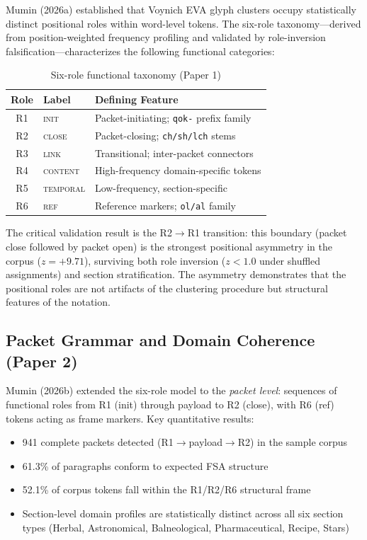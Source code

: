 \documentclass[11pt,a4paper,twocolumn]{article}
\begin{document}
Mumin (2026a) established that Voynich EVA glyph clusters occupy statistically distinct positional roles within word-level tokens. The six-role taxonomy---derived from position-weighted frequency profiling and validated by role-inversion falsification---characterizes the following functional categories:

\begin{table}[H]
\centering
\caption{Six-role functional taxonomy (Paper 1)}
\label{tab:roles}
\small
\begin{tabular}{@{}clp{3.5cm}@{}}
\toprule
\textbf{Role} & \textbf{Label} & \textbf{Defining Feature} \\
\midrule
R1 & \textsc{init} & Packet-initiating; \texttt{qok-} prefix family \\
R2 & \textsc{close} & Packet-closing; \texttt{ch/sh/lch} stems \\
R3 & \textsc{link} & Transitional; inter-packet connectors \\
R4 & \textsc{content} & High-frequency domain-specific tokens \\
R5 & \textsc{temporal} & Low-frequency, section-specific \\
R6 & \textsc{ref} & Reference markers; \texttt{ol/al} family \\
\bottomrule
\end{tabular}
\end{table}

\noindent The critical validation result is the R2$\to$R1 transition: this boundary (packet close followed by packet open) is the strongest positional asymmetry in the corpus ($z = +9.71$), surviving both role inversion ($z < 1.0$ under shuffled assignments) and section stratification. The asymmetry demonstrates that the positional roles are not artifacts of the clustering procedure but structural features of the notation.

\subsection{Packet Grammar and Domain Coherence (Paper 2)}

Mumin (2026b) extended the six-role model to the \textit{packet level}: sequences of functional roles from R1 (init) through payload to R2 (close), with R6 (ref) tokens acting as frame markers. Key quantitative results:

\begin{itemize}[leftmargin=*,itemsep=2pt]
    \item 941 complete packets detected (R1$\to$payload$\to$R2) in the sample corpus
    \item 61.3\% of paragraphs conform to expected FSA structure
    \item 52.1\% of corpus tokens fall within the R1/R2/R6 structural frame
    \item Section-level domain profiles are statistically distinct across all six section types (Herbal, Astronomical, Balneological, Pharmaceutical, Recipe, Stars)
\end{itemize}
\end{document}
